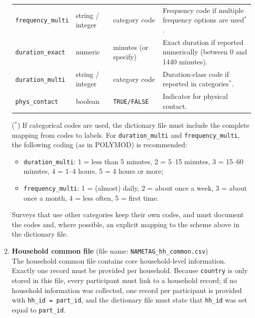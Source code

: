 \documentclass[11pt,a4paper]{article}
\begin{document}
\begin{enumerate}
\begin{table}[H]
{\begin{tabularx}{\textwidth}{l l l X}
    \texttt{frequency\_multi} &
    string / integer &
    category code &
    Frequency code if multiple frequency options are used$^{*}$.\\
    
    \texttt{duration\_exact} &
    numeric &
    minutes (or specify) &
    Exact duration if reported numerically (between 0 and 1440 minutes). \\
    
    \texttt{duration\_multi} &
    string / integer &
    category code &
    Duration-class code if reported in categories$^{*}$. \\
    
    \texttt{phys\_contact} &
    boolean &
    \texttt{TRUE/FALSE} &
    Indicator for physical contact. \\
    
    \bottomrule
    \end{tabularx}
    }
    \end{table}
    
    \noindent
    ($^{*}$) If categorical codes are used, the dictionary file must include the complete mapping from codes to labels.
    For \texttt{duration\_multi} and \texttt{frequency\_multi}, the following coding (as in POLYMOD) is recommended:
    \begin{itemize}
        \item \texttt{duration\_multi}: 1 = less than 5 minutes, 2 = 5--15 minutes, 3 = 15--60 minutes, 4 = 1--4 hours, 5 = 4 hours or more;
        \item \texttt{frequency\_multi}: 1 = (almost) daily, 2 = about once a week, 3 = about once a month, 4 = less often, 5 = first time.
    \end{itemize}
    Surveys that use other categories keep their own codes, and must document the codes and, where possible, an explicit mapping to the scheme above in the dictionary file.

    \item \textbf{Household common file} (file name: \texttt{NAMETAG\_hh\_common.csv}) \\
    The household common file contains core household-level information. Exactly one record must be provided per household. Because \texttt{country} is only stored in this file, every participant must link to a household record; if no household information was collected, one record per participant is provided with \texttt{hh\_id = part\_id}, and the dictionary file must state that \texttt{hh\_id} was set equal to \texttt{part\_id}.


\end{enumerate}
\end{document}
